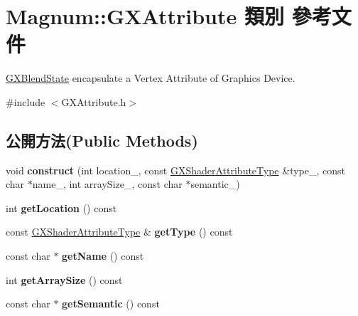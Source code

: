 \hypertarget{class_magnum_1_1_g_x_attribute}{}\section{Magnum\+:\+:G\+X\+Attribute 類別 參考文件}
\label{class_magnum_1_1_g_x_attribute}


\hyperlink{class_magnum_1_1_g_x_blend_state}{G\+X\+Blend\+State} encapsulate a Vertex Attribute of Graphics Device.  




{\ttfamily \#include $<$G\+X\+Attribute.\+h$>$}

\subsection*{公開方法(Public Methods)}
\begin{DoxyCompactItemize}
\item 
void {\bfseries construct} (int location\+\_\+, const \hyperlink{class_magnum_1_1_g_x_shader_attribute_type}{G\+X\+Shader\+Attribute\+Type} \&type\+\_\+, const char $\ast$name\+\_\+, int array\+Size\+\_\+, const char $\ast$semantic\+\_\+)\hypertarget{class_magnum_1_1_g_x_attribute_a53622feb4b2c5e2f42b94beeba60a16b}{}\label{class_magnum_1_1_g_x_attribute_a53622feb4b2c5e2f42b94beeba60a16b}

\item 
int {\bfseries get\+Location} () const \hypertarget{class_magnum_1_1_g_x_attribute_a2115f264e9eed1e82b5ee0506b2d796f}{}\label{class_magnum_1_1_g_x_attribute_a2115f264e9eed1e82b5ee0506b2d796f}

\item 
const \hyperlink{class_magnum_1_1_g_x_shader_attribute_type}{G\+X\+Shader\+Attribute\+Type} \& {\bfseries get\+Type} () const \hypertarget{class_magnum_1_1_g_x_attribute_ad5ad510c9dbf596b851dd5b268dd569e}{}\label{class_magnum_1_1_g_x_attribute_ad5ad510c9dbf596b851dd5b268dd569e}

\item 
const char $\ast$ {\bfseries get\+Name} () const \hypertarget{class_magnum_1_1_g_x_attribute_a3925e4629e42bc47e1451ab1019b4caf}{}\label{class_magnum_1_1_g_x_attribute_a3925e4629e42bc47e1451ab1019b4caf}

\item 
int {\bfseries get\+Array\+Size} () const \hypertarget{class_magnum_1_1_g_x_attribute_a77e9c24f826838e2667468f03959d40f}{}\label{class_magnum_1_1_g_x_attribute_a77e9c24f826838e2667468f03959d40f}

\item 
const char $\ast$ {\bfseries get\+Semantic} () const \hypertarget{class_magnum_1_1_g_x_attribute_a5cdaccde8ec9ae327e0dd4354e7fe5b2}{}\label{class_magnum_1_1_g_x_attribute_a5cdaccde8ec9ae327e0dd4354e7fe5b2}

\end{DoxyCompactItemize}
